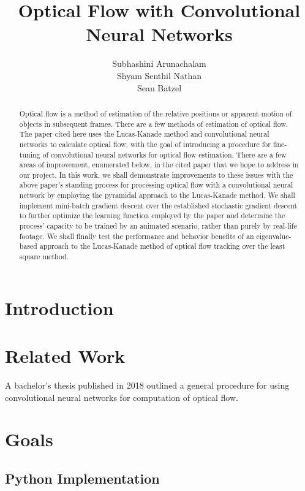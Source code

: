 \documentclass[]{article}
\title{Optical Flow with Convolutional Neural Networks}
\author{Subhashini Arunachalam\\Shyam Senthil Nathan\\Sean Batzel}
\begin{document}
\maketitle

\nocite{*}

\pagebreak
\begin{abstract}
    Optical flow is a method of estimation of the relative positions or apparent motion of objects in subsequent frames.
    There are a few methods of estimation of optical flow.
    The paper cited here uses the Lucas-Kanade method and convolutional neural networks to calculate optical flow, with the goal of introducing a procedure for fine-tuning of convolutional neural networks for optical flow estimation.
    There are a few areas of improvement, enumerated below, in the cited paper that we hope to address in our project.
    In this work, we shall demonstrate improvements to these issues with the above paper’s standing process for processing optical flow with a convolutional neural network by employing the pyramidal approach to the Lucas-Kanade method.
    We shall implement mini-batch gradient descent over the established stochastic gradient descent to further optimize the learning function employed by the paper and determine the process’ capacity to be trained by an animated scenario, rather than purely by real-life footage.
    We shall finally test the performance and behavior benefits of an eigenvalue-based approach to the Lucas-Kanade method of optical flow tracking over the least square method.
\end{abstract}

\section{Introduction}

\section{Related Work}
A bachelor's thesis published in 2018 outlined a general procedure for using convolutional neural networks for computation of optical flow.\cite{flett}

\section{Goals}
\subsection{Python Implementation}
\end{document}
